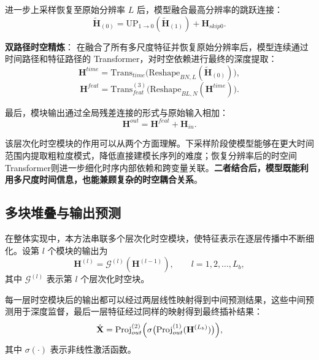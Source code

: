 进一步上采样恢复至原始分辨率 $L$ 后，模型融合最高分辨率的跳跃连接：
\begin{equation}
\tilde{\mathbf{H}}_{(0)} = \mathrm{UP}_{1\rightarrow0}(\tilde{\mathbf{H}}_{(1)}) + \mathbf{H}_{skip0}.
\end{equation}

\textbf{双路径时空精炼}： 在融合了所有多尺度特征并恢复原始分辨率后，模型连续通过时间路径和特征路径的 Transformer，对时空依赖进行最终的深度提取：
\begin{equation}
\mathbf{H}^{time} = \mathrm{Trans}_{time}\bigl(\mathrm{Reshape}_{BN,L}(\tilde{\mathbf{H}}_{(0)})\bigr),
\end{equation}
\begin{equation}
\mathbf{H}^{feat} = \mathrm{Trans}_{feat}^{(3)}\bigl(\mathrm{Reshape}_{BL,N}(\mathbf{H}^{time})\bigr).
\end{equation}

最后，模块输出通过全局残差连接的形式与原始输入相加：
\begin{equation}
\mathbf{H}^{out} = \mathbf{H}^{feat} + \mathbf{H}_{in}.
\end{equation}

该层次化时空模块的作用可以从两个方面理解。下采样阶段使模型能够在更大时间范围内提取粗粒度模式，降低直接建模长序列的难度；恢复分辨率后的时空间Transformer则进一步细化时序内部依赖和跨变量关联。\textbf{二者结合后，模型既能利用多尺度时间信息，也能兼顾复杂的时空耦合关系}。

\subsection{多块堆叠与输出预测}

在整体实现中，本方法串联多个层次化时空模块，使特征表示在逐层传播中不断细化。设第 \(l\) 个模块的输出为
\begin{equation}
\mathbf{H}^{(l)} = \mathcal{G}^{(l)}(\mathbf{H}^{(l-1)}), \qquad l=1,2,\dots,L_b,
\end{equation}
其中 \(\mathcal{G}^{(l)}\) 表示第 \(l\) 个层次化时空块。

每一层时空模块后的输出都可以经过两层线性映射得到中间预测结果，这些中间预测用于深度监督，最后一层特征经过同样的映射得到最终插补结果：
\begin{equation}
\hat{\mathbf{X}} = \mathrm{Proj}_{out}^{(2)}\Bigl(\sigma\bigl(\mathrm{Proj}_{out}^{(1)}(\mathbf{H}^{(L_b)})\bigr)\Bigr),
\end{equation}
其中 \(\sigma(\cdot)\) 表示非线性激活函数。



